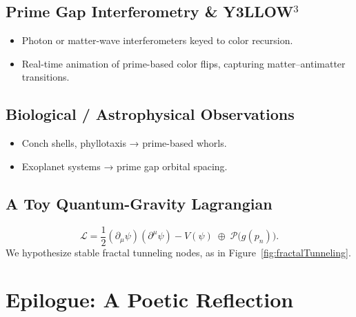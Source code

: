 \documentclass[11pt]{article}
\begin{document}
\subsection{Prime Gap Interferometry \& Y3LLOW$^3$}
\begin{itemize}
    \item Photon or matter-wave interferometers keyed to color recursion.  
    \item Real-time animation of prime-based color flips, capturing matter–antimatter transitions.
\end{itemize}

\subsection{Biological / Astrophysical Observations}
\begin{itemize}
    \item Conch shells, phyllotaxis → prime-based whorls.  
    \item Exoplanet systems → prime gap orbital spacing.  
\end{itemize}

\subsection{A Toy Quantum-Gravity Lagrangian}
$$
\mathcal{L} = \frac{1}{2}(\partial_\mu \psi)(\partial^\mu \psi) - V(\psi)
\;\oplus\;
\mathcal{P}\bigl(g(p_n)\bigr).
$$
We hypothesize stable fractal tunneling nodes, as in Figure~\ref{fig:fractalTunneling}.

\clearpage

\section*{Epilogue: A Poetic Reflection}
\label{sec:epilogue}
\end{document}
